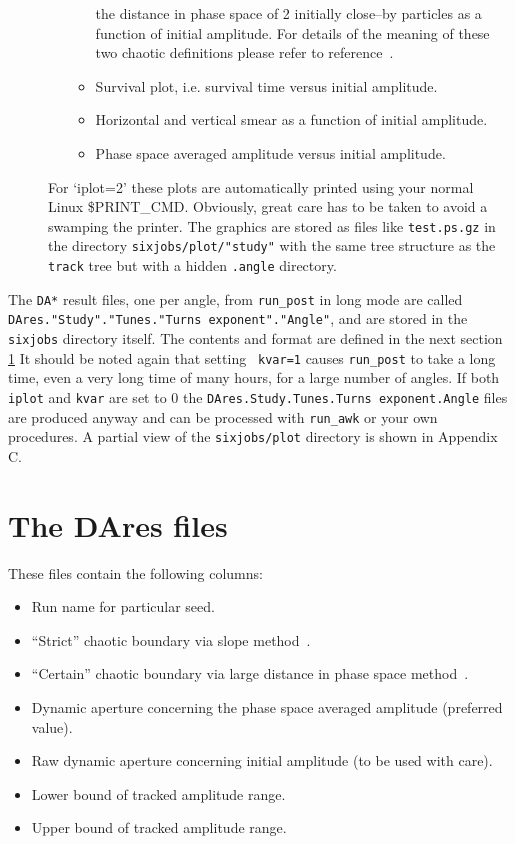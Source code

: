 \documentclass{cernatsnote}
\begin{document}
\begin{description}
\begin{itemize}
\begin{itemize}
      the distance in phase space of 2 initially close--by particles
      as a function of initial amplitude. For details of the meaning
      of these two chaotic definitions please refer to
      reference~\cite{LHC8}.
    \item Survival plot, i.e. survival time versus initial amplitude.
    \item Horizontal and vertical smear as a function of initial
      amplitude.
    \item Phase space averaged amplitude versus initial amplitude.
    \end{itemize}
  \end{itemize}
  For `iplot=2' these plots are automatically printed using
  your normal Linux \$PRINT\_CMD.
  Obviously, great care has to be taken to avoid a
  swamping the printer. The graphics are stored as files
  like {\tt test.ps.gz} in the directory  
  {\tt sixjobs/plot/"study"} with the same tree structure as the
  {\tt track} tree but with a hidden {\tt .angle} directory.
\end{description}

The {\tt DA*} result files, one per angle, from {\tt run\_post} in long mode
are called {\tt DAres."Study"."Tunes."Turns exponent"."Angle"}, and are stored
in the {\tt sixjobs} directory itself.  The contents and format are defined in
the next section \ref{sec:DAres} It should be noted again that setting {\tt
kvar=1} causes {\tt run\_post} to take a long time, even a very long time of
many hours, for a large number of angles. If both {\tt iplot} and {\tt kvar}
are set to 0 the {\tt DAres.Study.Tunes.Turns exponent.Angle} files are
produced anyway and can be processed with {\tt run\_awk} or your own
procedures. A partial view of the {\tt sixjobs/plot} directory is shown in
Appendix C.

\section{The DAres files}
\label{sec:DAres}
These files contain the following columns:
\begin{itemize}
\item Run name for particular seed.
\item ``Strict'' chaotic boundary via slope method~\cite{LHC8}.
\item ``Certain'' chaotic boundary via large distance in phase space
  method~\cite{LHC8}.
\item Dynamic aperture concerning the phase space averaged amplitude
  (preferred value).
\item Raw dynamic aperture concerning initial amplitude (to be used
  with care).
\item Lower bound of tracked amplitude range.
\item Upper bound of tracked amplitude range.
\end{itemize}
\end{document}
